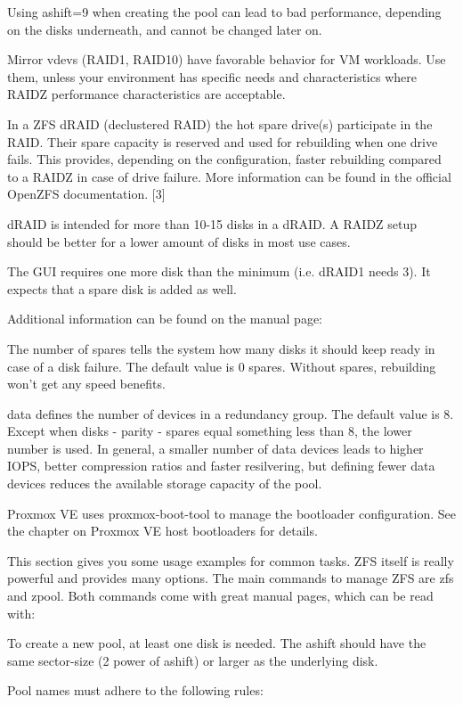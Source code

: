 Using ashift=9 when creating the pool can lead to bad performance, depending on the disks underneath, and cannot be changed later on.

Mirror vdevs (RAID1, RAID10) have favorable behavior for VM workloads. Use them, unless your environment has specific needs and characteristics where RAIDZ performance characteristics are acceptable.

In a ZFS dRAID (declustered RAID) the hot spare drive(s) participate in the RAID. Their spare capacity is reserved and used for rebuilding when one drive fails. This provides, depending on the configuration, faster rebuilding compared to a RAIDZ in case of drive failure. More information can be found in the official OpenZFS documentation. [3]

dRAID is intended for more than 10-15 disks in a dRAID. A RAIDZ setup should be better for a lower amount of disks in most use cases.

The GUI requires one more disk than the minimum (i.e. dRAID1 needs 3). It expects that a spare disk is added as well.

Additional information can be found on the manual page:

The number of spares tells the system how many disks it should keep ready in case of a disk failure. The default value is 0 spares. Without spares, rebuilding won’t get any speed benefits.

data defines the number of devices in a redundancy group. The default value is 8. Except when disks - parity - spares equal something less than 8, the lower number is used. In general, a smaller number of data devices leads to higher IOPS, better compression ratios and faster resilvering, but defining fewer data devices reduces the available storage capacity of the pool.

Proxmox VE uses proxmox-boot-tool to manage the bootloader configuration. See the chapter on Proxmox VE host bootloaders for details.

This section gives you some usage examples for common tasks. ZFS itself is really powerful and provides many options. The main commands to manage ZFS are zfs and zpool. Both commands come with great manual pages, which can be read with:

To create a new pool, at least one disk is needed. The ashift should have the same sector-size (2 power of ashift) or larger as the underlying disk.

Pool names must adhere to the following rules:

